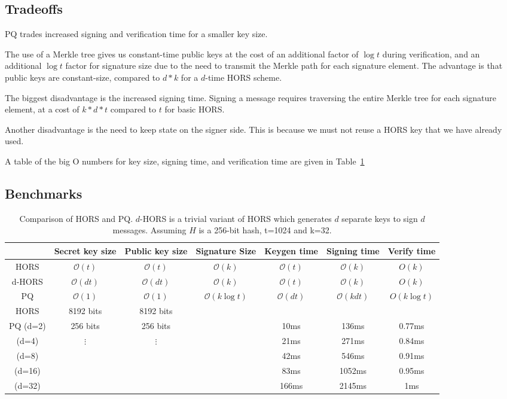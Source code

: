 \documentclass[10pt]{article}
\renewcommand{\O}{\mathcal{O}}
\begin{document}
\subsection{Tradeoffs}

PQ trades increased signing and verification time for a smaller key size.

The use of a Merkle tree gives us constant-time public keys at the cost of an additional factor of $\log t$ during verification, and an additional $\log t$ factor for signature size due to the need to transmit the Merkle path for each signature element. The advantage is that public keys are constant-size, compared to $d*k$ for a $d$-time HORS scheme.

The biggest disadvantage is the increased signing time. Signing a message requires traversing the entire Merkle tree for each signature element, at a cost of $k*d*t$ compared to $t$ for basic HORS.

Another disadvantage is the need to keep state on the signer side. This is because we must not reuse a HORS key that we have already used.

A table of the big O numbers for key size, signing time, and verification time are given in Table~\ref{tab:hors}


\subsection{Benchmarks}

\begin{table}
\begin{tabular}{ccccccc}
\hline
	 & Secret key size & Public key size & Signature Size & Keygen time & Signing time & Verify time \\
\hline
HORS & $\O(t)$ & $\O(t)$ & $\O(k)$ & $\O(t)$ & $\O(k)$ & $O(k)$ \\
d-HORS & $\O(dt)$ & $\O(dt)$ & $\O(k)$ & $\O(t)$ & $\O(k)$ & $O(k)$ \\
PQ	 & $\O(1)$ & $\O(1)$ & $\O(k \log t)$ & $\O(dt)$ & $\O(kdt)$ & $O(k \log t)$ \\
\hline
HORS & 8192 bits & 8192 bits & \\
PQ	  
(d=2) & 256 bits & 256 bits & & 10ms & 136ms & 0.77ms \\
(d=4) & $\vdots$ & $\vdots$ & & 21ms & 271ms & 0.84ms \\
(d=8) & & &  & 42ms & 546ms & 0.91ms \\
(d=16) & & & & 83ms & 1052ms & 0.95ms \\
(d=32) & & & & 166ms & 2145ms & 1ms \\
\hline
\end{tabular}
\caption{Comparison of HORS and PQ. $d$-HORS is a trivial variant of HORS which generates $d$ separate keys to sign $d$ messages. Assuming $H$ is a 256-bit hash, t=1024 and k=32. }
\label{tab:hors}
\end{table}
\end{document}
